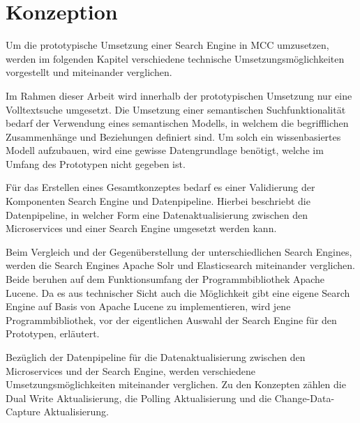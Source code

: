 \chapter{Konzeption\label{chap4:Viertes-Kapitel}}

Um die prototypische Umsetzung einer Search Engine in MCC umzusetzen, werden im folgenden Kapitel verschiedene technische Umsetzungsmöglichkeiten vorgestellt und miteinander verglichen.

Im Rahmen dieser Arbeit wird innerhalb der prototypischen Umsetzung nur eine Volltextsuche umgesetzt. Die Umsetzung einer semantischen Suchfunktionalität bedarf der Verwendung eines semantischen Modells, in welchem die begrifflichen Zusammenhänge und Beziehungen definiert sind. Um solch ein wissenbasiertes Modell aufzubauen, wird eine gewisse Datengrundlage benötigt, welche im Umfang des Prototypen nicht gegeben ist.


Für das Erstellen eines Gesamtkonzeptes bedarf es einer Validierung der Komponenten \glqq Search Engine\grqq{} und \glqq Datenpipeline\grqq{}. Hierbei beschriebt die Datenpipeline, in welcher Form eine Datenaktualisierung zwischen den Microservices und einer Search Engine umgesetzt werden kann.

Beim Vergleich und der Gegenüberstellung der unterschiedlichen Search Engines, werden die Search Engines \glqq Apache Solr\grqq{} und \glqq Elasticsearch\grqq{} miteinander verglichen. Beide beruhen auf dem Funktionsumfang der Programmbibliothek \glqq Apache Lucene\grqq{}. Da es aus technischer Sicht auch die Möglichkeit gibt eine eigene Search Engine auf Basis von \glqq Apache Lucene\grqq{} zu implementieren, wird jene Programmbibliothek, vor der eigentlichen Auswahl der Search Engine für den Prototypen, erläutert.

Bezüglich der Datenpipeline für die Datenaktualisierung zwischen den Microservices und der Search Engine, werden verschiedene Umsetzungsmöglichkeiten miteinander verglichen. Zu den Konzepten zählen die \glqq Dual Write Aktualisierung\grqq{}, die \glqq Polling Aktualisierung\grqq{} und die \glqq Change-Data-Capture Aktualisierung\grqq{}.

